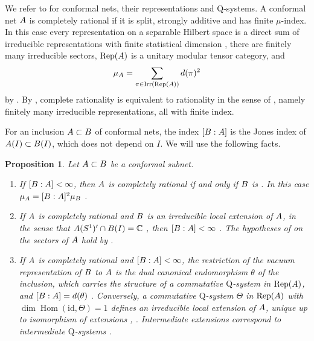 \documentclass[leqno]{article}
\newcommand{\Cbb}{\ensuremath{\mathbb{C}}}
\newcommand{\Q}{\mathrm{Q}}
\let\cal\relax
\newcommand{\cal}{\mathcal}
\DeclareMathOperator{\Irr}{Irr} %
\DeclareMathOperator{\Rep}{Rep} %
\newtheorem{prop}[thm]{Proposition}
\numberwithin{equation}{section}
\begin{document}
We refer to \cite{KLM01,BKLR15} for conformal nets, their representations and $\Q$-systems. A conformal net $\cal A$ is completely rational if it is split, strongly additive and has finite $\mu$-index. In this case every representation on a separable Hilbert space is a direct sum of irreducible representations with finite statistical dimension \cite[Corollary 39 p.~27]{KLM01}, there are finitely many irreducible sectors, $\Rep(\cal A)$ is a unitary modular tensor category, and
\begin{equation}
\label{eq:mu-index}
\mu_{\cal A} = \sum_{\pi \in \Irr(\Rep(\cal A))} d(\pi)^2
\end{equation}
by \cite[Theorem 33 p.~24]{KLM01}. By \cite{LoX04,MTW18}, complete rationality is equivalent to rationality in the sense of \cite[Section 4.4 p.~54]{Ten24}, namely finitely many irreducible representations, all with finite index.

For an inclusion $\cal A \subset \cal B$ of conformal nets, the index $[\cal B : \cal A]$ is the Jones index of $\cal A(I) \subset \cal B(I)$, which does not depend on $I$. We will use the following facts.

\begin{prop}
\label{prop:nets}
Let $\cal A \subset \cal B$ be a conformal subnet.
\begin{enumerate}
\item If $[\cal B : \cal A] < \infty$, then $\cal A$ is completely rational if and only if $\cal B$ is \cite[Theorem 24 p.~20]{Lon03}. In this case $\mu_{\cal A} = [\cal B : \cal A]^2\mu_{\cal B}$ \cite[Proposition 24 p.~19]{KLM01}.
\item If $\cal A$ is completely rational and $\cal B$ is an irreducible local extension of $\cal A$, in the sense that $\cal A(S^1)' \cap \cal B(I) = \Cbb$ \cite[p.~9]{KL04}, then $[\cal B : \cal A] < \infty$ \cite[Proposition 2.3 p.~12]{KL04}. The hypotheses of \cite[Proposition 2.3]{KL04} on the sectors of $\cal A$ hold by \cite[Theorem 33 p.~24 and Corollary 39 p.~27]{KLM01}.
\item If $\cal A$ is completely rational and $[\cal B : \cal A] < \infty$, the restriction of the vacuum representation of $\cal B$ to $\cal A$ is the dual canonical endomorphism $\theta$ of the inclusion, which carries the structure of a commutative $\Q$-system in $\Rep(\cal A)$, and $[\cal B : \cal A] = d(\theta)$ \cite[Theorem 4.9 p.~25]{LoR95}. Conversely, a commutative $\Q$-system $\Theta$ in $\Rep(\cal A)$ with $\dim\operatorname{Hom}(\mathrm{id},\Theta) = 1$ defines an irreducible local extension of $\cal A$, unique up to isomorphism of extensions \cite[Theorem 4.9 p.~25]{LoR95}, \cite[Section 5.2.1 p.~77]{BKLR15}. Intermediate extensions correspond to intermediate $\Q$-systems \cite[Proposition 4.11 p.~49]{BKLR15}.
\end{enumerate}
\end{prop}
\end{document}
